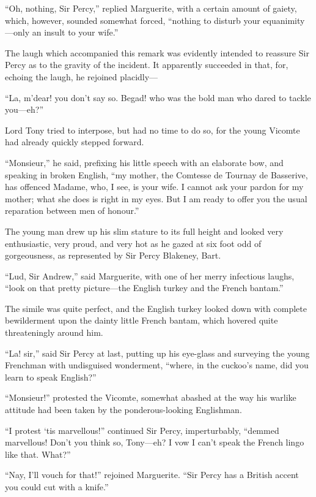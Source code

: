 \documentclass[paper=5.5in:8.5in,BCOR=7mm,twoside,DIV=calc,12pt,usegeometry,chapterprefix,endperiod,headings=big]{scrbook}
\begin{document}
\enquote{Oh, nothing, Sir Percy,} replied Marguerite, with a certain amount of gaiety, which, however, sounded somewhat forced, \enquote{nothing to disturb your equanimity---only an insult to your wife.}

The laugh which accompanied this remark was evidently intended to reassure Sir Percy as to the gravity of the incident. It apparently succeeded in that, for, echoing the laugh, he rejoined placidly---

\enquote{La, m'dear! you don't say so. Begad! who was the bold man who dared to tackle you---eh?}

Lord Tony tried to interpose, but had no time to do so, for the young Vicomte had already quickly stepped forward.

\enquote{Monsieur,} he said, prefixing his little speech with an elaborate bow, and speaking in broken English, \enquote{my mother, the Comtesse de Tournay de Basserive, has offenced Madame, who, I see, is your wife. I cannot ask your pardon for my mother; what she does is right in my eyes. But I am ready to offer you the usual reparation between men of honour.}

The young man drew up his slim stature to its full height and looked very enthusiastic, very proud, and very hot as he gazed at six foot odd of gorgeousness, as represented by Sir Percy Blakeney, Bart.

\enquote{Lud, Sir Andrew,} said Marguerite, with one of her merry infectious laughs, \enquote{look on that pretty picture---the English turkey and the French bantam.}

The simile was quite perfect, and the English turkey looked down with complete bewilderment upon the dainty little French bantam, which hovered quite threateningly around him.

\enquote{La! sir,} said Sir Percy at last, putting up his eye-glass and surveying the young Frenchman with undisguised wonderment, \enquote{where, in the cuckoo's name, did you learn to speak English?}

\enquote{Monsieur!} protested the Vicomte, somewhat abashed at the way his warlike attitude had been taken by the ponderous-looking Englishman.

\enquote{I protest `tis marvellous!} continued Sir Percy, imperturbably, \enquote{demmed marvellous! Don't you think so, Tony---eh? I vow I can't speak the French lingo like that. What?}

\enquote{Nay, I'll vouch for that!} rejoined Marguerite. \enquote{Sir Percy has a British accent you could cut with a knife.}
\end{document}
